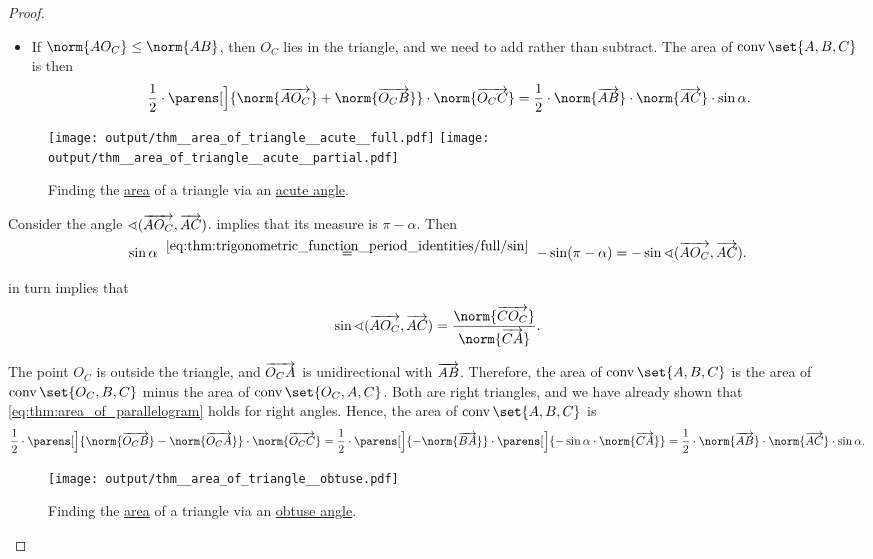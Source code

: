 \begin{proof}
\begin{itemize}
    \item If \( \norm{A O_C} \leq \norm{A B} \), then \( O_C \) lies in the triangle, and we need to add rather than subtract. The area of \( \conv\set{ A, B, C } \) is then
    \begin{equation*}
      \frac 1 2 \cdot \parens[\Big]{ \norm{\vect{A O_C}} + \norm{\vect{O_C B}} } \cdot \norm{\vect{O_C C}} = \frac 1 2 \cdot \norm{\vect{AB}} \cdot \norm{\vect{AC}} \cdot \sin \alpha.
    \end{equation*}
  \end{itemize}

  \begin{figure}[!ht]
    \hfill
    \hfill
    \texttt{[image: output/thm\_\_area\_of\_triangle\_\_acute\_\_full.pdf]}
    \hfill
    \texttt{[image: output/thm\_\_area\_of\_triangle\_\_acute\_\_partial.pdf]}
    \hfill
    \caption{Finding the \hyperref[def:figure_area]{area} of a triangle via an \hyperref[def:angle/acute]{acute angle}.}\label{fig:thm:area_of_triangle/acute}
  \end{figure}

   Consider the angle \( \sphericalangle(\overrightarrow{A O_C}, \overrightarrow{A C}) \).  implies that its measure is \( \pi - \alpha \). Then
  \begin{equation*}
    \sin \alpha
    \reloset {\eqref{eq:thm:trigonometric_function_period_identities/full/sin}} =
    -\sin(\pi - \alpha)
    =
    -\sin \sphericalangle(\vect{A O_C}, \vect{A C}).
  \end{equation*}

   in turn implies that
  \begin{equation*}
    \sin \sphericalangle(\vect{A O_C}, \vect{A C})
    =
    \frac {\norm{\vect{C O_C}}} {\norm{\vect{CA}}}.
  \end{equation*}

  The point \( O_C \) is outside the triangle, and \( \overrightarrow{O_C A} \) is unidirectional with \( \overrightarrow{AB} \). Therefore, the area of \( \conv\set{ A, B, C } \) is the area of \( \conv\set{ O_C, B, C } \) minus the area of \( \conv\set{ O_C, A, C } \). Both are right triangles, and we have already shown that \eqref{eq:thm:area_of_parallelogram} holds for right angles. Hence, the area of \( \conv\set{ A, B, C } \) is
  \begin{equation*}
    \frac 1 2 \cdot \parens[\Big]{ \norm{\vect{O_C B}} - \norm{\vect{O_C A}} } \cdot \norm{\vect{O_C C}}
    =
    \frac 1 2 \cdot \parens[\Big]{ -\norm{\vect{B A}} } \cdot \parens[\Big]{ -\sin \alpha \cdot \norm{\vect{CA}} }
    =
    \frac 1 2 \cdot \norm{\vect{AB}} \cdot \norm{\vect{AC}} \cdot \sin \alpha.
  \end{equation*}

  \begin{figure}[!ht]
    \centering
    \texttt{[image: output/thm\_\_area\_of\_triangle\_\_obtuse.pdf]}
    \caption{Finding the \hyperref[def:figure_area]{area} of a triangle via an \hyperref[def:angle/obtuse]{obtuse angle}.}\label{fig:thm:area_of_triangle/obtuse}
  \end{figure}
\end{proof}

